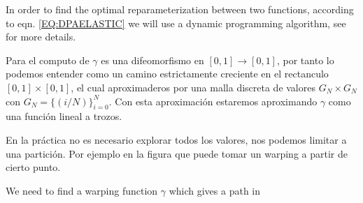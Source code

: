 

In order to find the optimal reparameterization between two functions,
according to eqn. \ref{EQ:DPAELASTIC} we will use a dynamic programming algorithm, see
\cite{Srivastava2016} for more details.

Para el computo de $\gamma$ es una difeomorfismo en $[0, 1] \rightarrow [0, 1]$,
por tanto lo podemos entender como un camino estrictamente creciente en el
rectanculo $[0, 1] \times [0, 1]$, el cual aproximaderos por una malla
discreta de valores $G_N \times G_N$ con $G_N = \{ (i/N)\}_{i=0}^N$.
Con esta aproximación estaremos aproximando $\gamma$ como una función lineal a
trozos.

En la práctica no es necesario explorar todos los valores, nos podemos limitar a
una partición. Por ejemplo en la figura %
que puede tomar un warping a partir de cierto punto.










We need to find a warping function $\gamma$ which gives
a path in
